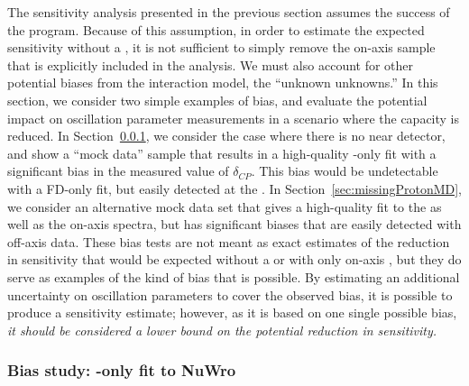 The sensitivity analysis presented in the previous section assumes the success of the  program. Because of this assumption, in order to estimate the expected sensitivity without a , it is not sufficient to simply remove the on-axis   sample that is explicitly included in the analysis. We must also account for other potential biases from the interaction model, the ``unknown unknowns.'' In this section, we consider two simple examples of bias, and evaluate the potential impact on oscillation parameter measurements in a scenario where the  capacity is reduced. In Section~\ref{sec:FDonlyNuWro}, we consider the case where there is no near detector, and show a ``mock data'' sample that results in a high-quality -only fit with a significant bias in the measured value of $\delta_{CP}$. This bias would be undetectable with a FD-only fit, but easily detected at the . In Section~\ref{sec:missingProtonMD}, we consider an alternative mock data set that gives a high-quality fit to the  as well as the on-axis  spectra, but has significant biases that are easily detected with off-axis  data. These bias tests are not meant as exact estimates of the reduction in sensitivity that would be expected without a  or with only on-axis , but they do serve as examples of the kind of bias that is possible. By estimating an additional uncertainty on oscillation parameters to cover the observed bias, it is possible to produce a sensitivity estimate; however, as it is based on one single possible bias, {\em it should be considered a lower bound on the potential reduction in sensitivity.}

\subsubsection{Bias study: -only fit to NuWro}
\label{sec:FDonlyNuWro}


